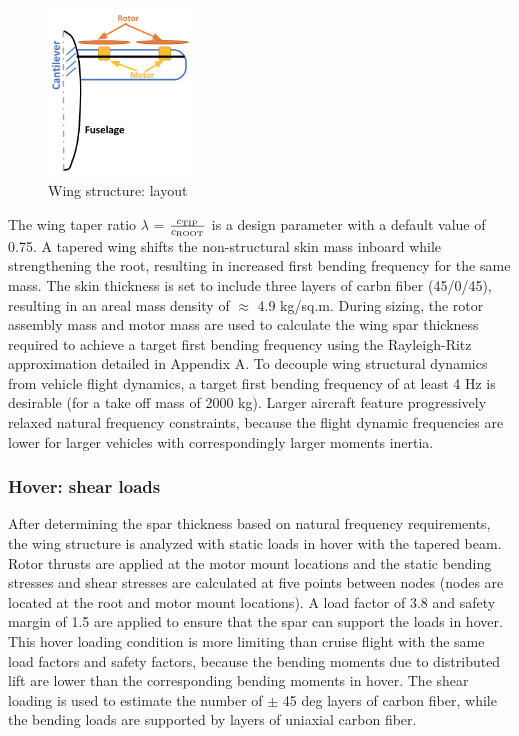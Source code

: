 \begin{figure} 
\begin{center}
\includegraphics[width=0.35\textwidth]{images/wing_layout.png}
\caption{Wing structure: layout}
\label{fig:wing_layout}
\end{center}
\end{figure}

The wing taper ratio $\lambda$ = $\frac{c_{\rm TIP}}{c_{\rm ROOT}}$ is a design parameter with a default value of 0.75. A tapered wing shifts the non-structural skin mass inboard while strengthening the root, resulting in increased first bending frequency for the same mass. The skin thickness is set to include three layers of carbn fiber (45/0/45), resulting in an areal mass density of $\approx$ 4.9 kg/sq.m. During sizing, the rotor assembly mass and motor mass are used to calculate the wing spar thickness required to achieve a target first bending frequency using the Rayleigh-Ritz approximation detailed in Appendix A. To decouple wing structural dynamics from vehicle flight dynamics, a target first bending frequency of at least 4 Hz is desirable (for a take off mass of 2000 kg). Larger aircraft feature progressively relaxed natural frequency constraints, because the flight dynamic frequencies are lower for larger vehicles with correspondingly larger moments inertia.

\subsubsection{Hover: shear loads}
After determining the spar thickness based on natural frequency requirements, the wing structure is analyzed with static loads in hover with the tapered beam. Rotor thrusts are applied at the motor mount locations and the static bending stresses and shear stresses are calculated at five points between nodes (nodes are located at the root and motor mount locations). A load factor of 3.8 and safety margin of 1.5 are applied to ensure that the spar can support the loads in hover. This hover loading condition is more limiting than cruise flight with the same load factors and safety factors, because the bending moments due to distributed lift are lower than the corresponding bending moments in hover. The shear loading is used to estimate the number of $\pm$ 45 deg layers of carbon fiber, while the bending loads are supported by layers of uniaxial carbon fiber. 

